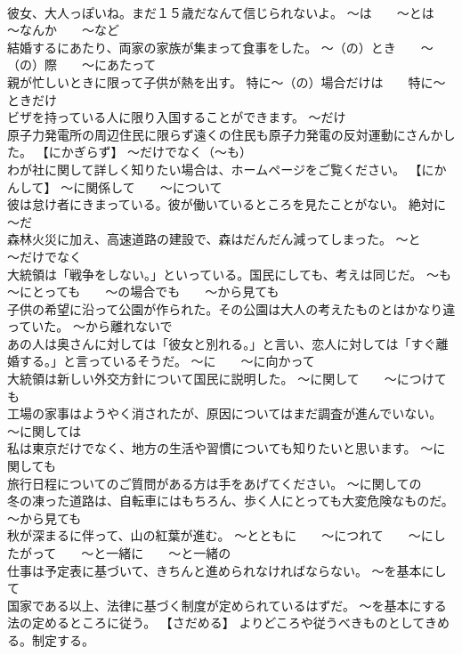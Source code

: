 \documentclass[8pt]{extreport}
\begin{document}
\begin{CJK}{UTF8}{min}
\\	彼女、大人っぽいね。まだ１５歳だなんて信じられないよ。	～は　　～とは　　～なんか　　～など
\\	結婚するにあたり、両家の家族が集まって食事をした。	～（の）とき　　～（の）際　　～にあたって
\\	親が忙しいときに限って子供が熱を出す。	特に～（の）場合だけは　　特に～ときだけ
\\	ビザを持っている人に限り入国することができます。	～だけ
\\	原子力発電所の周辺住民に限らず遠くの住民も原子力発電の反対運動にさんかした。	【にかぎらず】 ～だけでなく（～も）
\\	わが社に関して詳しく知りたい場合は、ホームページをご覧ください。	【にかんして】 ～に関係して　　～について
\\	彼は怠け者にきまっている。彼が働いているところを見たことがない。	絶対に～だ
\\	森林火災に加え、高速道路の建設で、森はだんだん減ってしまった。	～と　　～だけでなく
\\	大統領は「戦争をしない。」といっている。国民にしても、考えは同じだ。	～も　　～にとっても　　～の場合でも　　～から見ても
\\	子供の希望に沿って公園が作られた。その公園は大人の考えたものとはかなり違っていた。	～から離れないで
\\	あの人は奥さんに対しては「彼女と別れる。」と言い、恋人に対しては「すぐ離婚する。」と言っているそうだ。	～に　　～に向かって
\\	大統領は新しい外交方針について国民に説明した。	～に関して　　～につけても
\\	工場の家事はようやく消されたが、原因についてはまだ調査が進んでいない。	～に関しては
\\	私は東京だけでなく、地方の生活や習慣についても知りたいと思います。	～に関しても
\\	旅行日程についてのご質問がある方は手をあげてください。	～に関しての
\\	冬の凍った道路は、自転車にはもちろん、歩く人にとっても大変危険なものだ。	～から見ても
\\	秋が深まるに伴って、山の紅葉が進む。	～とともに　　～につれて　　～にしたがって　　～と一緒に　　～と一緒の
\\	仕事は予定表に基づいて、きちんと進められなければならない。	～を基本にして
\\	国家である以上、法律に基づく制度が定められているはずだ。	～を基本にする
\\	法の定めるところに従う。	【さだめる】 よりどころや従うべきものとしてきめる。制定する。

\end{CJK}
\end{document}
